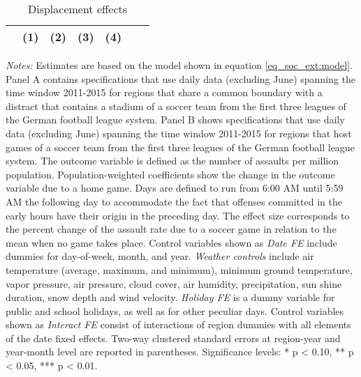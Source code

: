 \documentclass[11pt, a4paper]{article} %
\begin{document}
\begin{landscape}
\begin{table}[H]
\begin{threeparttable}
\begin{tablenotes}
			\end{tablenotes} 
		\end{threeparttable} 
	\end{table}
	\vspace*{\fill}\clearpage 
\end{landscape}
\restoregeometry 


\vspace*{\fill}
\begin{table}[H] \centering 
	\begin{threeparttable} \centering \caption{Displacement effects}\label{tab_soc_ext:reg_fe_assrate_displacement}
		{\def\sym#1{\ifmmode^{#1}\else\(^{#1}\)\fi} 
			\begin{tabular}{l*{6}{c}}
				\toprule 
				&\multicolumn{1}{c}{(1)}&\multicolumn{1}{c}{(2)}&\multicolumn{1}{c}{(3)}&\multicolumn{1}{c}{(4)}\\
				\midrule
				 
				\bottomrule 
		\end{tabular}}
		\begin{tablenotes} 
			\item \scriptsize \emph{Notes:} Estimates are based on the model shown in equation \ref{eq_soc_ext:model}. Panel A contains specifications that use daily data (excluding June) spanning the time window 2011-2015 for regions that share a common boundary with a distract that contains a stadium of a soccer team from the first three leagues of the German football league system. Panel B shows specifications that use daily data (excluding June) spanning the time window 2011-2015 for regions that host games of a soccer team from the first three leagues of the German football league system.	The outcome variable is defined as the number of assaults per million population. Population-weighted coefficients show the change in the outcome variable due to a home game. Days are defined to run from 6:00 AM until 5:59 AM the following day to accommodate the fact that offenses committed in the early hours have their origin in the preceding day. The effect size corresponds to the percent change of the assault rate due to a soccer game in relation to the mean when no game takes place. Control variables shown as \textit{Date FE} include dummies for day-of-week, month, and year. \textit{Weather controls} include air temperature (average, maximum, and minimum), minimum ground temperature, vapor pressure, air pressure, cloud cover, air humidity, precipitation, sun shine duration, snow depth and wind velocity. \textit{Holiday FE} is a dummy variable for public and school holidays, as well as for other peculiar days. Control variables shown as \textit{Interact FE} consist of interactions of region dummies with all elements of the date fixed effects. Two-way clustered standard errors at region-year and year-month level are reported in parentheses. \newline Significance levels: * p < 0.10, ** p < 0.05, *** p < 0.01.
		\end{tablenotes} 
	\end{threeparttable} 
\end{table}
\end{document}
